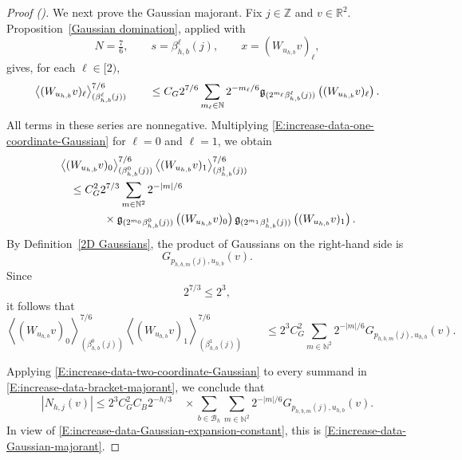 \documentclass[12pt,reqno]{amsart}
\newcommand{\auto}{{({\tiny\faCar})}}
\theoremstyle{plain}
\numberwithin{equation}{section}
\theoremstyle{remark}
\begin{document}
\begin{proof}[Proof \auto]
We next prove the Gaussian majorant. Fix \(j\in\mathbb Z\) and
\(v\in\mathbb R^2\). Proposition~\ref{Gaussian domination}, applied
with
\[
N=\tfrac76,
\qquad
s=\beta_{h,b}^\ell(j),
\qquad
x=(W_{u_{h,b}}v)_\ell,
\]
gives, for each \(\ell\in[2)\),
\begin{equation}
    \label{E:increase-data-one-coordinate-Gaussian}
    \left\langle (W_{u_{h,b}}v)_\ell \right\rangle_{(\beta_{h,b}^\ell(j))}^{7/6} \qquad\leq C_G2^{7/6} \sum_{m_\ell\in\mathbb N} 2^{-m_\ell/6} \mathfrak{g}_{(2^{m_\ell}\beta_{h,b}^\ell(j))} \left((W_{u_{h,b}}v)_\ell\right).
\end{equation}
All terms in these series are nonnegative. Multiplying
\eqref{E:increase-data-one-coordinate-Gaussian} for
\(\ell=0\) and \(\ell=1\), we obtain
\[
\begin{aligned}
&
\left\langle
(W_{u_{h,b}}v)_0
\right\rangle_{(\beta_{h,b}^0(j))}^{7/6}
\left\langle
(W_{u_{h,b}}v)_1
\right\rangle_{(\beta_{h,b}^1(j))}^{7/6}
\\
&\quad\leq
C_G^2 2^{7/3}
\sum_{m\in\mathbb N^2}
2^{-|m|/6}
\\
&\qquad\qquad\times
\mathfrak{g}_{(2^{m_0}\beta_{h,b}^0(j))}
\left((W_{u_{h,b}}v)_0\right)
\mathfrak{g}_{(2^{m_1}\beta_{h,b}^1(j))}
\left((W_{u_{h,b}}v)_1\right).
\end{aligned}
\]
By Definition~\ref{2D Gaussians}, the product of Gaussians on the
right-hand side is
\[
G_{p_{h,b,m}(j),u_{h,b}}(v).
\]
Since
\[
2^{7/3}\leq2^3,
\]
it follows that
\begin{equation}
    \label{E:increase-data-two-coordinate-Gaussian}
    \left\langle (W_{u_{h,b}}v)_0 \right\rangle_{(\beta_{h,b}^0(j))}^{7/6} \left\langle (W_{u_{h,b}}v)_1 \right\rangle_{(\beta_{h,b}^1(j))}^{7/6} \qquad\leq 2^3C_G^2 \sum_{m\in\mathbb N^2} 2^{-|m|/6} G_{p_{h,b,m}(j),u_{h,b}}(v).
\end{equation}

Applying \eqref{E:increase-data-two-coordinate-Gaussian} to every
summand in
\eqref{E:increase-data-bracket-majorant}, we conclude that
\[
|N_{h,j}(v)| \leq 2^3C_G^2C_B 2^{-h/3} \quad\times \sum_{b\in\mathcal B_h} \sum_{m\in\mathbb N^2} 2^{-|m|/6} G_{p_{h,b,m}(j),u_{h,b}}(v).
\]
In view of
\eqref{E:increase-data-Gaussian-expansion-constant}, this is
\eqref{E:increase-data-Gaussian-majorant}.


\end{proof}
\end{document}
